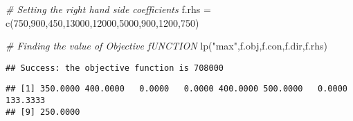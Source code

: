 \documentclass[
]{article}
\newenvironment{Shaded}{\begin{snugshade}}{\end{snugshade}}
\newcommand{\CommentTok}[1]{\textcolor[rgb]{0.56,0.35,0.01}{\textit{#1}}}
\newcommand{\DecValTok}[1]{\textcolor[rgb]{0.00,0.00,0.81}{#1}}
\newcommand{\FunctionTok}[1]{\textcolor[rgb]{0.00,0.00,0.00}{#1}}
\newcommand{\NormalTok}[1]{#1}
\newcommand{\OtherTok}[1]{\textcolor[rgb]{0.56,0.35,0.01}{#1}}
\newcommand{\SpecialCharTok}[1]{\textcolor[rgb]{0.00,0.00,0.00}{#1}}
\newcommand{\StringTok}[1]{\textcolor[rgb]{0.31,0.60,0.02}{#1}}
\begin{document}
\begin{Shaded}
\begin{Highlighting}[]
\CommentTok{\# Setting the right hand side coefficients}
\NormalTok{f.rhs }\OtherTok{=} \FunctionTok{c}\NormalTok{(}\DecValTok{750}\NormalTok{,}\DecValTok{900}\NormalTok{,}\DecValTok{450}\NormalTok{,}\DecValTok{13000}\NormalTok{,}\DecValTok{12000}\NormalTok{,}\DecValTok{5000}\NormalTok{,}\DecValTok{900}\NormalTok{,}\DecValTok{1200}\NormalTok{,}\DecValTok{750}\NormalTok{)}

\CommentTok{\# Finding the value of Objective fUNCTION}
\FunctionTok{lp}\NormalTok{(}\StringTok{"max"}\NormalTok{,f.obj,f.con,f.dir,f.rhs)}
\end{Highlighting}
\end{Shaded}

\begin{verbatim}
## Success: the objective function is 708000
\end{verbatim}

\begin{Shaded}
\end{Shaded}

\begin{verbatim}
## [1] 350.0000 400.0000   0.0000   0.0000 400.0000 500.0000   0.0000 133.3333
## [9] 250.0000
\end{verbatim}
\end{document}
